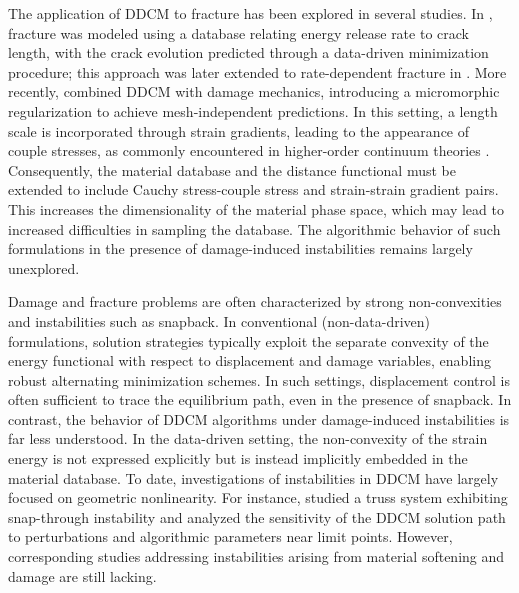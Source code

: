 \documentclass[10pt]{cas-sc}
\begin{document}
The application of DDCM to fracture has been explored in several studies. In \cite{Carrara2020}, fracture was modeled using a database relating energy release rate to crack length, with the crack evolution predicted through a data-driven minimization procedure; this approach was later extended to rate-dependent fracture in \cite{Carrara2021}. More recently, \cite{Ulloa2024} combined DDCM with damage mechanics, introducing a micromorphic regularization to achieve mesh-independent predictions. In this setting, a length scale is incorporated through strain gradients, leading to the appearance of couple stresses, as commonly encountered in higher-order continuum theories \cite{Mindlin1968,Xia1996}. Consequently, the material database and the distance functional must be extended to include Cauchy stress-couple stress and strain-strain gradient pairs. This increases the dimensionality of the material phase space, which may lead to increased difficulties in sampling the database. The algorithmic behavior of such formulations in the presence of damage-induced instabilities remains largely unexplored.

Damage and fracture problems are often characterized by strong non-convexities and instabilities such as snapback. In conventional (non-data-driven) formulations, solution strategies typically exploit the separate convexity of the energy functional with respect to displacement and damage variables, enabling robust alternating minimization schemes. In such settings, displacement control is often sufficient to trace the equilibrium path, even in the presence of snapback. In contrast, the behavior of DDCM algorithms under damage-induced instabilities is far less understood. In the data-driven setting, the non-convexity of the strain energy is not expressed explicitly but is instead implicitly embedded in the material database. To date, investigations of instabilities in DDCM have largely focused on geometric nonlinearity. For instance, \cite{Kuang2023} studied a truss system exhibiting snap-through instability and analyzed the sensitivity of the DDCM solution path to perturbations and algorithmic parameters near limit points. However, corresponding studies addressing instabilities arising from material softening and damage are still lacking.
\end{document}
